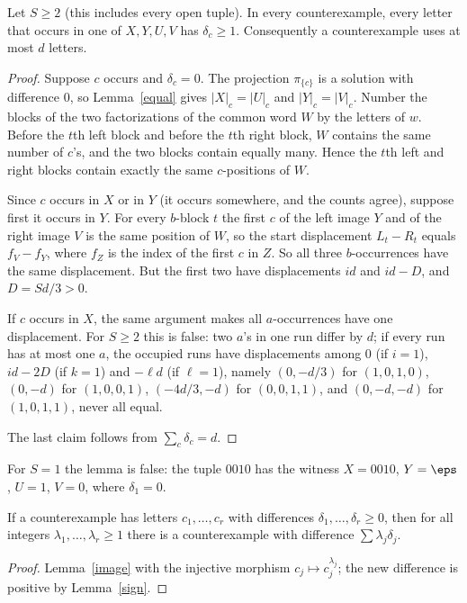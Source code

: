 \begin{lemma}\label{strict}
Let \(S\ge2\) (this includes every open tuple). In every counterexample, every letter that occurs in one of \(X,Y,U,V\) has \(\delta_c\ge1\). Consequently a counterexample uses at most \(d\) letters.
\end{lemma}
\begin{proof}
Suppose \(c\) occurs and \(\delta_c=0\). The projection \(\pi_{\{c\}}\) is a solution with difference \(0\), so Lemma~\ref{equal} gives \(|X|_c=|U|_c\) and \(|Y|_c=|V|_c\). Number the blocks of the two factorizations of the common word \(W\) by the letters of \(w\). Before the \(t\)th left block and before the \(t\)th right block, \(W\) contains the same number of \(c\)'s, and the two blocks contain equally many. Hence the \(t\)th left and right blocks contain exactly the same \(c\)-positions of \(W\).

Since \(c\) occurs in \(X\) or in \(Y\) (it occurs somewhere, and the counts agree), suppose first it occurs in \(Y\). For every \(b\)-block \(t\) the first \(c\) of the left image \(Y\) and of the right image \(V\) is the same position of \(W\), so the start displacement \(L_t-R_t\) equals \(f_V-f_Y\), where \(f_Z\) is the index of the first \(c\) in \(Z\). So all three \(b\)-occurrences have the same displacement. But the first two have displacements \(id\) and \(id-D\), and \(D=Sd/3>0\).

If \(c\) occurs in \(X\), the same argument makes all \(a\)-occurrences have one displacement. For \(S\ge2\) this is false: two \(a\)'s in one run differ by \(d\); if every run has at most one \(a\), the occupied runs have displacements among \(0\) (if \(i=1\)), \(id-2D\) (if \(k=1\)) and \(-\ell d\) (if \(\ell=1\)), namely \((0,-d/3)\) for \((1,0,1,0)\), \((0,-d)\) for \((1,0,0,1)\), \((-4d/3,-d)\) for \((0,0,1,1)\), and \((0,-d,-d)\) for \((1,0,1,1)\), never all equal.

The last claim follows from \(\sum_c\delta_c=d\).
\end{proof}
For \(S=1\) the lemma is false: the tuple \(0010\) has the witness \(X=0010\), \(Y=\eps\), \(U=1\), \(V=0\), where \(\delta_1=0\).

\begin{corollary}[Reweighting]\label{reweight}
If a counterexample has letters \(c_1,\dots,c_r\) with differences \(\delta_1,\dots,\delta_r\ge0\), then for all integers \(\lambda_1,\dots,\lambda_r\ge1\) there is a counterexample with difference \(\sum\lambda_j\delta_j\).
\end{corollary}
\begin{proof}
Lemma~\ref{image} with the injective morphism \(c_j\mapsto c_j^{\lambda_j}\); the new difference is positive by Lemma~\ref{sign}.
\end{proof}

